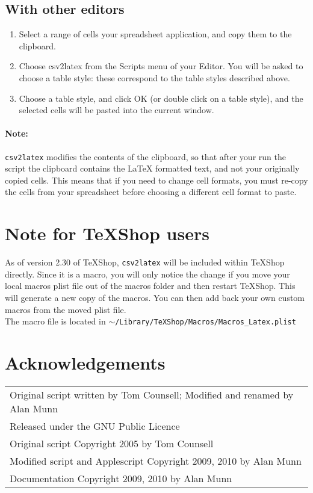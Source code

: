 \documentclass[11pt]{article}
\begin{document}
\subsection{With other editors}

\begin{enumerate}
\item Select a range of cells your spreadsheet application, and copy them to the clipboard.

\item Choose csv2latex from the Scripts menu of your Editor. You will be asked to choose a table style: these correspond to the table styles described above.
\item Choose a table style, and click OK (or double click on a table style), and the selected cells will be pasted into the current window.

\end{enumerate}
\paragraph{Note:} \texttt{csv2latex} modifies the contents of the clipboard, so that after your run the script the clipboard contains the LaTeX formatted text, and not your originally copied cells.  This means that if you need to change cell formats, you must re-copy the cells from your spreadsheet before choosing a different cell format to paste.
\section{Note for TeXShop users}
As of version 2.30 of TeXShop, \texttt{csv2latex} will be included within TeXShop directly.  Since it is a macro, you will only notice the change if you move your local macros plist file out of the macros folder and then restart TeXShop.  This will generate a new copy of the macros. You can then add back your own custom macros from the moved plist file.\\The macro file is located in  \texttt{$\sim$/Library/TeXShop/Macros/Macros\_Latex.plist}
\section{Acknowledgements}
\begin{tabular}{l}
Original script written by Tom Counsell; Modified and renamed by Alan Munn\\
Released under the GNU Public Licence\\
Original script Copyright 2005 by Tom Counsell\\
Modified script and Applescript Copyright 2009, 2010 by Alan Munn\\
Documentation Copyright 2009, 2010 by Alan Munn\\
\end{tabular}
\end{document}
